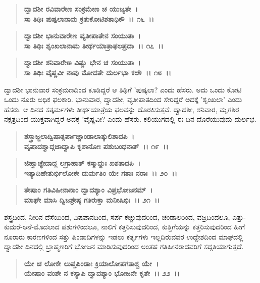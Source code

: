 \begin{verse}
\textbf{ದ್ವಾದಶೀ ರವಿವಾರೇಣ ಸಂಕ್ರಮೇಣ ಚ ಯುಜ್ಯತೇ~।}\\\textbf{ಸಾ ತಿಥಿಃ ಪುಷ್ಪಲಾನಾಮ ಕ್ರತುಕೋಟಿಶತಾಧಿಕೌ~।। ೧೬~।।} 
\end{verse}

\begin{verse}
\textbf{ದ್ವಾದಶೀ ಭಾನುವಾರೇಣ ವ್ಯತೀಪಾತೇನ ಸಂಯುತಾ~।}\\\textbf{ಸಾ ತಿಥಿಃ ಶೃಂಖಲಾನಾಮ ತೀರ್ಥಯಾತ್ರಾಫಲಪ್ರದಾ~।। ೧೭~।। }
\end{verse}

\begin{verse}
\textbf{ದ್ವಾದಶೀ ಶನಿವಾರೇಣ ವಿಷ್ಣು ಭೇನ ಚ ಸಂಯುತಾ~।}\\\textbf{ಸಾ ತಿಥಿಃ ವೈಷ್ಣವೀ ನಾವು ಮೋದತೇ ದುರ್ಲಭಾ ಕಲೌ~।। ೧೮~।।}
\end{verse}

ದ್ವಾದಶೀ ಭಾನುವಾರ ಸಂಕ್ರಮಣದಿಂದ ಕೂಡಿದ್ದರೆ ಆ ತಿಥಿಗೆ 'ಪುಷ್ಕಲಾ? ಎಂದು ಹೆಸರು. ಅದು ಒಂದು ಕೋಟಿ ಒಂದು ನೂರು ಅಧಿಕ ಫಲಕಾರಿ. ಭಾನುವಾರ, ದ್ವಾದಶೀ, ವ್ಯತೀಪಾತದಿಂದ ಸೇರಿದ್ದರೆ ಅದಕ್ಕೆ 'ಶೃಂಖಲಾ' ಎಂದು ಹೆಸರು. ಆ ದಿನದ ಸತ್ಕರ್ಮಗಳು ತೀರ್ಥಯಾತ್ರೆಯ ಫಲವನ್ನು ದೊರಕಿಸುತ್ತವೆ. ದ್ವಾದಶೀ, ಶನಿವಾರ, ಮೃಗಶಿರ ನಕ್ಷತ್ರದಿಂದ ಯುಕ್ತವಾಗಿದ್ದರೆ ಅದಕ್ಕೆ 'ವೈಷ್ಣವೀ? ಎಂದು ಹೆಸರು. ಕಲಿಯುಗದಲ್ಲಿ ಈ ದಿನ ದೊರೆಯುವುದು ದುರ್ಲಭ.

\begin{verse}
\textbf{ಶಸ್ತ್ರಾಜ್ಜಲಾದ್ವಿಷಾತ್ಸರ್ಪಾಚ್ಚಾಂಡಾಲಾತ್ಕುಲಿಶಾದಪಿ~।}\\\textbf{ವೃಷಾದಶ್ವಾದ್ಗಜಾದ್ವಾಪಿ ಕೃಶಾನೋಃ ಪಶುಬಂಧನಾತ್~।। ೧೯~।। }
\end{verse}

\begin{verse}
\textbf{ಜಿಹ್ವಾಚ್ಛೇದಾದ್ಗ ಲಗ್ರಾಹಾತ್ ಕಸ್ಮಾದ್ದುಃ ಖಶತಾದಪಿ~।}\\\textbf{ಇತ್ಯಾದಿಹೇತುರ್ಭಿಲೋಕೇ ದುರ್ಮತಿಂ ಯೇ ಗತಾಃ ನರಾಃ~।। ೨೦~।। }
\end{verse}

\begin{verse}
\textbf{ತೇಷಾಂ ಗತಿವಿಹೀನಾನಾಂ ದ್ವಾದಶ್ಯಾಂ ವಿಪ್ರಭೋಜನಮ್~।}\\\textbf{ಮಾಘೇ ಮಾಸಿ ದ್ವಿಜಶ್ರೇಷ್ಠ ಗತಿರುಕ್ತಾ ಮನೀಷಿಭಿಃ~।। ೨೧~।।}
\end{verse}

ಶಸ್ತ್ರದಿಂದ, ನೀರಿನ ದೆಸೆಯಿಂದ, ವಿಷಪಾನದಿಂದ, ಸರ್ಪ ಕಚ್ಚುವುದರಿಂದ, ಚಂಡಾಲರಿಂದ, ವಜ್ರದಿಂದಲೂ, ಎತ್ತು-ಕುದುರೆ-ಆನೆ-ಮೊದಲಾದ ಪಶುಗಳಿಂದಲೂ, ನಾಲಿಗೆ ಕತ್ತರಿಸುವುದರಿಂದ, ಕುತ್ತಿಗೆಯನ್ನು ಕತ್ತರಿಸುವುದರಿಂದ ಹೀಗೆ ನೂರಾರು ಕಾರಣಗಳಿಂದ ಸತ್ತು ಪಿಂಡಾದಿಗಳನ್ನು ಇಡಲು ಕರ್ತೃಗಳು ಇಲ್ಲದಿರುವವರ ಉದ್ದೇಶದಿಂದ ಮಾಘದಲ್ಲಿ ದ್ವಾದಶೀ ದಿನದಲ್ಲಿ ಬ್ರಾಹ್ಮಣರಿಗೆ ಭೋಜನ ಮಾಡಿಸುವುದರಿಂದ ಅಂತಹ ಗತಿಹೀನರಾದವರಿಗೆ ಸದ್ಗತಿಯಾಗುತ್ತದೆ.

\begin{verse}
\textbf{ಯೇ ಚ ಲೋಕೇ ಲುಪ್ತಪಿಂಡಾಃ ಕ್ರಿಯಾಲೋಪಗತಾಶ್ಚ ಯೇ~।}\\\textbf{ಯೇಷಾಂ ವಂಶೇ ನ ಕಸ್ಯಾಪಿ ದ್ವಾದಶ್ಯಾಂ ಭೋಜನೇ ಕೃತೇ~।। ೨೨~।।} 
\end{verse}

